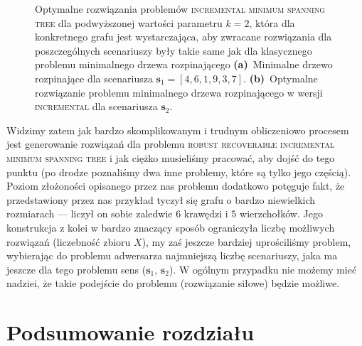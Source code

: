 \begin{figure}[!h]
\begin{subfigure}[b]{0.3\textwidth}
		\caption{}
		\label{fig:robincrexampleopt:b}
	\end{subfigure}
	\hfill\null
	\caption{
		Optymalne rozwiązania problemów \textsc{incremental minimum spanning tree} dla podwyższonej wartości parametru $k = 2$, która dla konkretnego grafu jest wystarczająca, aby zwracane rozwiązania dla poszczególnych scenariuszy były takie same jak dla klasycznego problemu minimalnego drzewa rozpinającego
		\textbf{(a)}~Minimalne drzewo rozpinające dla scenariusza $\textbf{s}_{1} = \left[ 4, 6, 1, 9, 3, 7 \right]$.
		\textbf{(b)}~Optymalne rozwiązanie problemu minimalnego drzewa rozpinającego w wersji \textsc{incremental} dla scenariusza $\textbf{s}_{2}$.
	}
	\label{fig:robincrexampleopt}
\end{figure}

\vspace*{5pt}

Widzimy zatem jak bardzo skomplikowanym i trudnym obliczeniowo procesem jest generowanie rozwiązań dla problemu \textsc{robust recoverable incremental minimum spanning tree} i jak ciężko musieliśmy pracować, aby dojść do tego punktu (po drodze poznaliśmy dwa inne problemy, które są tylko jego częścią). Poziom złożoności opisanego przez nas problemu dodatkowo potęguje fakt, że przedstawiony przez nas przykład tyczył się grafu o bardzo niewielkich rozmiarach --- liczył on sobie zaledwie $6$ krawędzi i $5$ wierzchołków. Jego konstrukcja z kolei w bardzo znaczący sposób ograniczyła liczbę możliwych rozwiązań (liczebność zbioru $X$), my zaś jeszcze bardziej uprościliśmy problem, wybierając do problemu adwersarza najmniejszą liczbę scenariuszy, jaka ma jeszcze dla tego problemu sens ($\textbf{s}_{1}$, $\textbf{s}_{2}$). W ogólnym przypadku nie możemy mieć nadziei, że takie podejście do problemu (rozwiązanie siłowe) będzie możliwe.


\section{Podsumowanie rozdziału}

